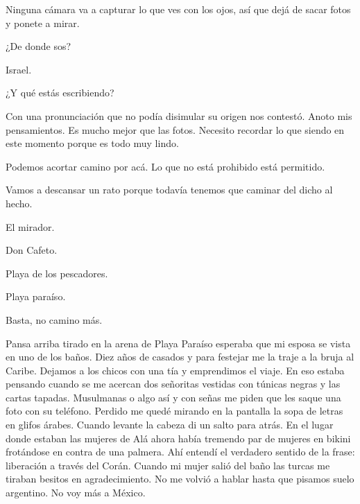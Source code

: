 \documentclass[11pt,twoside,openright,a6paper]{book}
\begin{document}
Ninguna cámara va a capturar lo que ves con los ojos, así que dejá de sacar fotos y ponete a mirar.

\vspace{0.5cm}

¿De donde sos?

Israel.

¿Y qué estás escribiendo?

Con una pronunciación que no podía disimular su origen nos contestó. Anoto mis pensamientos. Es mucho mejor que las fotos. Necesito recordar lo que siendo en este momento porque es todo muy lindo.

\vspace{0.5cm}

Podemos acortar camino por acá. Lo que no está prohibido está permitido.

\vspace{0.5cm}

Vamos a descansar un rato porque todavía tenemos que caminar del dicho al hecho.

\vspace{0.5cm}

El mirador.

Don Cafeto.

Playa de los pescadores.

Playa paraíso.

Basta, no camino más.

\vspace{0.5cm}

Pansa arriba tirado en la arena de Playa Paraíso esperaba que mi esposa se vista en uno de los baños. Diez años de casados y para festejar me la traje a la bruja al Caribe. Dejamos a los chicos con una tía y emprendimos el viaje. En eso estaba pensando cuando se me acercan dos señoritas vestidas con túnicas negras y las cartas tapadas. Musulmanas o algo así y con señas me piden que les saque una foto con su teléfono. Perdido me quedé mirando en la pantalla la sopa de letras en glifos árabes. Cuando levante la cabeza di un salto para atrás. En el lugar donde estaban las mujeres de Alá ahora había tremendo par de mujeres en bikini frotándose en contra de una palmera. Ahí entendí el verdadero sentido de la frase: liberación a través del Corán. Cuando mi mujer salió del baño las turcas me tiraban besitos en agradecimiento. No me volvió a hablar hasta que pisamos suelo argentino. No voy más a México.

\vspace{0.5cm}
\end{document}
